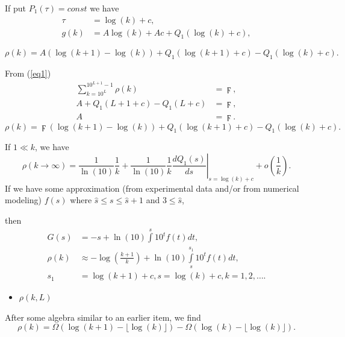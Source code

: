 \documentclass[titlepage,fleqn]{article}%
\begin{document}
If put $P_{1}(\tau)=const$ we have%
\begin{align*}
\tau &  =\log(k)+c,\\
g(k)  &  =A\log(k)+Ac+Q_{1}(\log(k)+c),
\end{align*}
%

\begin{equation}
\rho(k)=A\left(  \log(k+1)-\log(k)\right)  +Q_{1}(\log(k+1)+c)-Q_{1}%
(\log(k)+c). \label{SolK0}%
\end{equation}


From (\ref{eq1})
\begin{align}%
{\displaystyle\sum\limits_{k=10^{L}}^{10^{L+1}-1}}
\rho(k)  &  =\digamma,\\
A+Q_{1}(L+1+c)-Q_{1}(L+c)  &  =\digamma,\nonumber\\
A  &  =\digamma.\nonumber
\end{align}%
\begin{equation}
\rho(k)=\digamma\left(  \log(k+1)-\log(k)\right)  +Q_{1}(\log(k+1)+c)-Q_{1}%
(\log(k)+c). \label{SolK}%
\end{equation}


If $1\ll k$, we have%
\begin{equation}
\rho(k\rightarrow\infty)=\frac{1}{\ln(10)}\frac{1}{k}+\frac{1}{\ln(10)}%
\frac{1}{k}\left.  \frac{dQ_{1}(s)}{ds}\right\vert _{s=\log(k)+c}+o\left(
\frac{1}{k}\right)  . \label{AsymptK}%
\end{equation}
If we have some approximation (from experimental data and/or from numerical
modeling) $f(s)$ where $\hat{s}\leq s\leq\hat{s}+1$ and $3\leq\hat{s}$,

\noindent then%
\begin{align*}
G(s)  &  =-s+\ln(10)%
{\displaystyle\int\limits^{s}}
10^{t}f(t)dt,\\
\rho(k)  &  \approx-\log\left(  \frac{k+1}{k}\right)  +\ln(10)%
{\displaystyle\int\limits_{s}^{s_{1}}}
10^{t}f(t)dt,\\
s_{1}  &  =\log\left(  k+1\right)  +c,s=\log\left(  k\right)  +c,k=1,2,\ldots.
\end{align*}


\begin{itemize}
\item $\rho(k,L)$
\end{itemize}

After some algebra similar to an earlier item, we find%
\begin{equation}
\rho(k)=\Omega(\log(k+1)-\lfloor\log(k)\rfloor)-\Omega(\log(k)-\lfloor
\log(k)\rfloor). \label{SolK_L}%
\end{equation}
\end{document}
